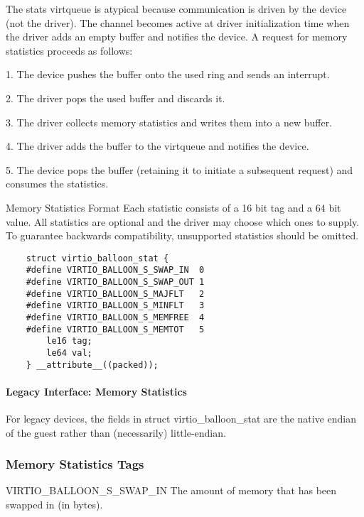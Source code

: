 The stats virtqueue is atypical because communication is driven
by the device (not the driver). The channel becomes active at
driver initialization time when the driver adds an empty buffer
and notifies the device. A request for memory statistics proceeds
as follows:

1. The device pushes the buffer onto the used ring and sends an
  interrupt.

2. The driver pops the used buffer and discards it.

3. The driver collects memory statistics and writes them into a
  new buffer.

4. The driver adds the buffer to the virtqueue and notifies the
  device.

5. The device pops the buffer (retaining it to initiate a
  subsequent request) and consumes the statistics.

  Memory Statistics Format Each statistic consists of a 16 bit
  tag and a 64 bit value. All statistics are optional and the
  driver may choose which ones to supply. To guarantee backwards
  compatibility, unsupported statistics should be omitted.

\begin{lstlisting}
	struct virtio_balloon_stat {
	#define VIRTIO_BALLOON_S_SWAP_IN  0
	#define VIRTIO_BALLOON_S_SWAP_OUT 1
	#define VIRTIO_BALLOON_S_MAJFLT   2
	#define VIRTIO_BALLOON_S_MINFLT   3
	#define VIRTIO_BALLOON_S_MEMFREE  4
	#define VIRTIO_BALLOON_S_MEMTOT   5
		le16 tag;
		le64 val;
	} __attribute__((packed));
\end{lstlisting}

\paragraph{Legacy Interface: Memory Statistics}\label{sec:Device Types / Memory Balloon Device / Device Operation / Memory Statistics / Legacy Interface: Memory Statistics}
For legacy devices, the fields in struct virtio_balloon_stat are the
native endian of the guest rather than (necessarily) little-endian.


\subsubsection{Memory Statistics Tags}\label{sec:Device Types / Memory Balloon Device / Device Operation / Memory Statistics Tags}

  VIRTIO_BALLOON_S_SWAP_IN The amount of memory that has been
  swapped in (in bytes).

